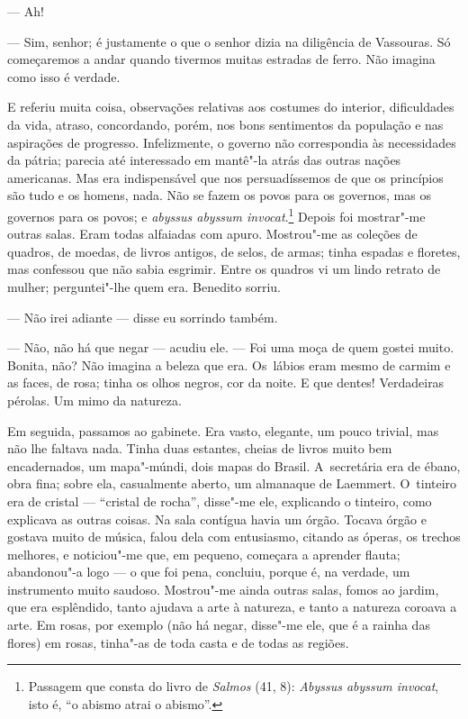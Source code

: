 \begin{linenumbers}
--- Ah!

--- Sim, senhor; é justamente o que o senhor dizia na diligência de
Vassouras. Só começaremos a andar quando tivermos muitas estradas de
ferro. Não imagina como isso é verdade.

E referiu muita coisa, observações relativas aos costumes do interior,
dificuldades da vida, atraso, concordando, porém, nos bons sentimentos
da população e nas aspirações de progresso. Infelizmente, o governo não
correspondia às necessidades da pátria; parecia até interessado em
mantê"-la atrás das outras nações americanas. Mas era indispensável que
nos persuadíssemos de que os princípios são tudo e os homens, nada. Não
se fazem os povos para os governos, mas os governos para os povos; e
\emph{abyssus abyssum invocat}.\footnote{Passagem que consta do livro de
  \emph{Salmos} (41, 8): \emph{Abyssus abyssum invocat}, isto é, ``o
  abismo atrai o abismo''.} Depois foi mostrar"-me outras salas. Eram
todas alfaiadas com apuro. Mostrou"-me as coleções de quadros, de moedas,
de livros antigos, de selos, de armas; tinha espadas e floretes, mas
confessou que não sabia esgrimir. Entre os quadros vi um lindo retrato
de mulher; perguntei"-lhe quem era. Benedito sorriu.

--- Não irei adiante --- disse eu sorrindo também.

--- Não, não há que negar --- acudiu ele. --- Foi uma moça de quem gostei
muito. Bonita, não? Não imagina a beleza que era. Os~lábios eram mesmo
de carmim e as faces, de rosa; tinha os olhos negros, cor da noite. E
que dentes! Verdadeiras pérolas. Um mimo da natureza.

Em seguida, passamos ao gabinete. Era vasto, elegante, um pouco trivial,
mas não lhe faltava nada. Tinha duas estantes, cheias de livros muito
bem encadernados, um mapa"-múndi, dois mapas do Brasil. A~secretária era
de ébano, obra fina; sobre ela, casualmente aberto, um almanaque de
Laemmert. O~tinteiro era de cristal --- ``cristal de rocha'', disse"-me
ele, explicando o tinteiro, como explicava as outras coisas. Na sala
contígua havia um órgão. Tocava órgão e gostava muito de música, falou
dela com entusiasmo, citando as óperas, os trechos melhores, e
noticiou"-me que, em pequeno, começara a aprender flauta; abandonou"-a
logo --- o que foi pena, concluiu, porque é, na verdade, um instrumento
muito saudoso. Mostrou"-me ainda outras salas, fomos ao jardim, que era
esplêndido, tanto ajudava a arte à natureza, e tanto a natureza coroava
a arte. Em rosas, por exemplo (não há negar, disse"-me ele, que é a
rainha das flores) em rosas, tinha"-as de toda casta e de todas as
regiões.


\end{linenumbers}
